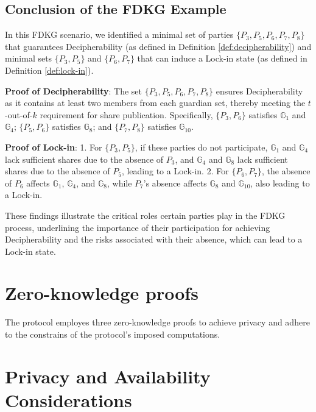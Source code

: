 \documentclass{article}
\begin{document}
\subsection*{Conclusion of the FDKG Example}

In this FDKG scenario, we identified a minimal set of parties \(\{P_3, P_5, P_6, P_7, P_8\}\) that guarantees Decipherability (as defined in Definition \ref{def:decipherability}) and minimal sets \(\{P_3, P_5\}\) and \(\{P_6, P_7\}\) that can induce a Lock-in state (as defined in Definition \ref{def:lock-in}).

\textbf{Proof of Decipherability}: 
The set \(\{P_3, P_5, P_6, P_7, P_8\}\) ensures Decipherability as it contains at least two members from each guardian set, thereby meeting the \(t\)-out-of-\(k\) requirement for share publication. Specifically, \(\{P_3, P_6\}\) satisfies \(\mathbb{G}_1\) and \(\mathbb{G}_4\); \(\{P_5, P_6\}\) satisfies \(\mathbb{G}_8\); and \(\{P_7, P_8\}\) satisfies \(\mathbb{G}_{10}\).

\textbf{Proof of Lock-in}:
1. For \(\{P_3, P_5\}\), if these parties do not participate, \(\mathbb{G}_1\) and \(\mathbb{G}_4\) lack sufficient shares due to the absence of \(P_3\), and \(\mathbb{G}_4\) and \(\mathbb{G}_8\) lack sufficient shares due to the absence of \(P_5\), leading to a Lock-in.
2. For \(\{P_6, P_7\}\), the absence of \(P_6\) affects \(\mathbb{G}_1\), \(\mathbb{G}_4\), and \(\mathbb{G}_8\), while \(P_7\)'s absence affects \(\mathbb{G}_8\) and \(\mathbb{G}_{10}\), also leading to a Lock-in.

These findings illustrate the critical roles certain parties play in the FDKG process, underlining the importance of their participation for achieving Decipherability and the risks associated with their absence, which can lead to a Lock-in state.


\section{Zero-knowledge proofs}

The protocol employes three zero-knowledge proofs to achieve privacy and adhere to the constrains of the protocol's imposed computations.



\section{Privacy and Availability Considerations}
\end{document}
